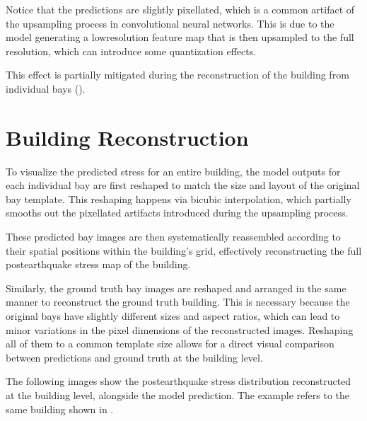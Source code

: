 \documentclass[letterpaper,10pt,english]{sphinxmanual}
\begin{document}
\sphinxAtStartPar
Notice that the predictions are slightly pixellated, which is a common
artifact of the upsampling process in convolutional neural networks.
This is due to the model generating a low\sphinxhyphen{}resolution feature map that is
then upsampled to the full resolution, which can introduce some quantization
effects.

\sphinxAtStartPar
This effect is partially mitigated during the reconstruction of the building
from individual bays ({\hyperref[\detokenize{predictions:reconstruction}]{}}).


\section{Building Reconstruction}
\label{\detokenize{predictions:building-reconstruction}}\label{\detokenize{predictions:reconstruction}}
\sphinxAtStartPar
To visualize the predicted stress for an entire building, the model outputs
for each individual bay are first reshaped to match the size and layout of
the original bay template.
This reshaping happens via bicubic interpolation, which partially smooths out
the pixellated artifacts introduced during the upsampling process.

\sphinxAtStartPar
These predicted bay images are then systematically reassembled according to
their spatial positions within the building’s grid, effectively reconstructing
the full post\sphinxhyphen{}earthquake stress map of the building.

\sphinxAtStartPar
Similarly, the ground truth bay images are reshaped and arranged in the same
manner to reconstruct the ground truth building.
This is necessary because the original bays have slightly different sizes and
aspect ratios, which can lead to minor variations in the pixel dimensions of
the reconstructed images.
Reshaping all of them to a common template size allows for a direct visual
comparison between predictions and ground truth at the building level.

\sphinxAtStartPar
\textendash{}

\sphinxAtStartPar
The following images show the post\sphinxhyphen{}earthquake stress distribution reconstructed
at the building level, alongside the model prediction.
The example refers to the same building shown in {\hyperref[\detokenize{data:data-section}]{}}.
\end{document}
